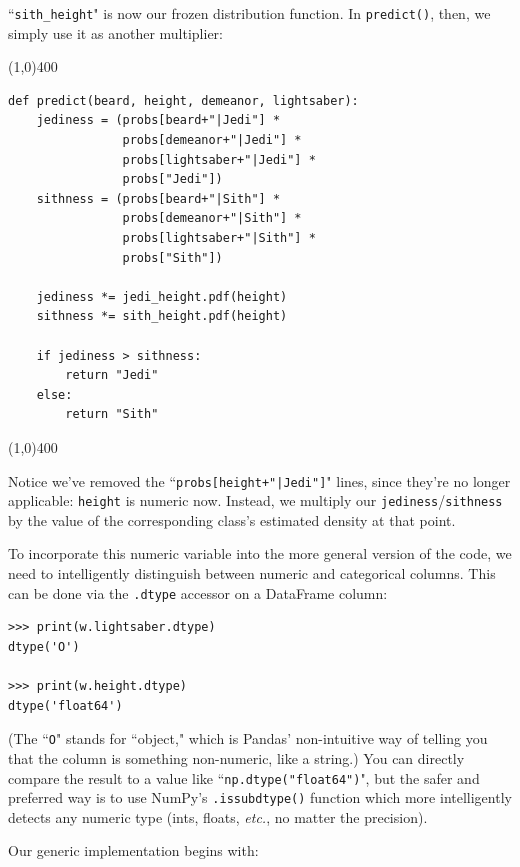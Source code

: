 \documentclass[12pt]{article}
\begin{document}
``\texttt{sith\_height}" is now our frozen distribution function. In 
\texttt{predict()}, then, we simply use it as another multiplier:

\begin{center}
\line(1,0){400}
\end{center}
\begin{Verbatim}[fontsize=\small,samepage=true,frame=none]
def predict(beard, height, demeanor, lightsaber):
    jediness = (probs[beard+"|Jedi"] *
                probs[demeanor+"|Jedi"] *
                probs[lightsaber+"|Jedi"] *
                probs["Jedi"])
    sithness = (probs[beard+"|Sith"] *
                probs[demeanor+"|Sith"] *
                probs[lightsaber+"|Sith"] *
                probs["Sith"])

    jediness *= jedi_height.pdf(height)
    sithness *= sith_height.pdf(height)

    if jediness > sithness:
        return "Jedi"
    else:
        return "Sith"
\end{Verbatim}
\begin{center}
\line(1,0){400}
\end{center}

Notice we've removed the ``\texttt{probs[height+"|Jedi"]}" lines,
since they're no longer applicable: \texttt{height} is numeric now. Instead,
we multiply our \texttt{jediness}/\texttt{sithness} by the value of the
corresponding class's estimated density at that point.

To incorporate this numeric variable into the more general version of the
code, we need to intelligently distinguish between numeric and categorical
columns. This can be done via the \texttt{.dtype} accessor on a DataFrame
column:

\begin{Verbatim}[fontsize=\small,samepage=true,frame=none]
>>> print(w.lightsaber.dtype)
dtype('O')

>>> print(w.height.dtype)
dtype('float64')
\end{Verbatim}

(The ``\texttt{O}" stands for ``object," which is Pandas' non-intuitive way of
telling you that the column is something non-numeric, like a string.) You can
directly compare the result to a value like ``\texttt{np.dtype("float64")}",
but the safer and preferred way is to use NumPy's \texttt{.issubdtype()}
function which more intelligently detects any numeric type (ints, floats,
\textit{etc.}, no matter the precision).

Our generic implementation begins with:
\end{document}
